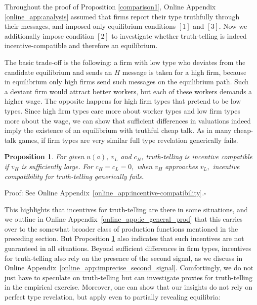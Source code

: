 \documentclass[12pt]{article}
\newtheorem{prop}{Proposition}
\begin{document}
Throughout the proof of Proposition \ref{comparison1}, Online Appendix \ref{online_app:analysis} assumed that firms report their type truthfully through their messages, and imposed only equilibrium conditions $[1]$ and $[3]$. Now we additionally impose condition $[2]$ to investigate whether truth-telling is indeed incentive-compatible and therefore an equilibrium.

The basic trade-off is the following: a firm with low type who deviates from the candidate equilibrium and sends an $H$ message is taken for a high firm, because in equilibrium only high firms send such messages on the equilibrium path. Such a deviant firm would attract better workers, but each of these workers demands a higher wage. The opposite happens for high firm types that pretend to be low types. Since high firm types care more about worker types and low firm types more about the wage, we can show that sufficient differences in valuations indeed imply the existence of an equilibrium with truthful cheap talk. As in many cheap-talk games, if firm types are very similar full type revelation generically fails.

\begin{prop}
\label{prop:incentive_compat} For given $u(a)$, $v_{L}$ and $c_{H}$, truth-telling is incentive compatible if $v_{H}$ is sufficiently large. For $c_{H}=c_{L}=0,$ when $v_{H}$ approaches $v_{L},$ incentive compatibility for truth-telling generically fails.
\end{prop}

\noindent Proof: See Online Appendix~\ref{online_app:incentive-compatibility}.$\square $\bigskip

\noindent This highlights that incentives for truth-telling are there in some situations, and we outline in Online Appendix~\ref{online_app:ic_general_prod} that this carries over to the somewhat broader class of production functions mentioned in the preceding section. But Proposition \ref{prop:incentive_compat} also indicates that such incentives are not guaranteed in all situations. Beyond sufficient differences in firm types, incentives for truth-telling also rely on the presence of the second signal, as we discuss in Online Appendix~\ref{online_app:imprecise_second_signal}. Comfortingly, we do not just have to speculate on truth-telling but can investigate proxies for truth-telling in the empirical exercise. Moreover, one can show that our insights do not rely on perfect type revelation, but apply even to partially revealing equilibria:
\end{document}
